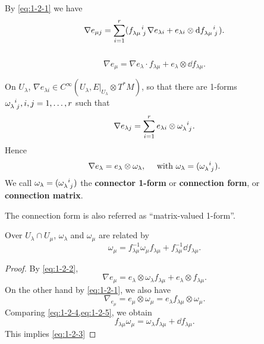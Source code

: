 \documentclass[12pt]{article}
\begin{document}
By \cref{eq:1-2-1} we have \[
    \nabla e_{\mu j}=\sum_{i=1}^{r}(\tensor{f}{_\lambda_\mu^i_j}\nabla 
    e_{\lambda i}+e_{\lambda i}\otimes \dd{\tensor{f}{_\lambda_\mu^i_j}})
.\] \ie\ 
\begin{equation}\label{eq:1-2-2}
    \nabla e_\mu=\nabla e_\lambda\cdot f_{\lambda\mu}+e_\lambda\otimes 
    \dd{f_{\lambda\mu}}
.\end{equation}

\begin{definition}
    On \(U_\lambda\), \(\nabla e_{\lambda i} \in C^\infty(U_\lambda,
    E\Big|_{U_\lambda}\otimes T^*M)\), so that there are 1-forms
    \(\tensor{\omega}{_\lambda^i_j}, i,j=1,\ldots,r\) such that \[
        \nabla e_{\lambda j}=\sum_{i=1}^{r}e_{\lambda i}\otimes 
        \tensor{\omega}{_\lambda^i_j}
    .\] Hence \[
        \nabla e_\lambda=e_\lambda\otimes \omega_\lambda, \quad
        \text{ with }\omega_\lambda=(\tensor{\omega}{_\lambda^i_j})
    .\] We call \(\omega_\lambda=(\tensor{\omega}{_\lambda^i_j})\) the
    \textbf{connector 1-form} or \textbf{connection form}, or
    \textbf{connection matrix}.
\end{definition}
The connection form is also referred as ``matrix-valued 1-form''.

\begin{prop}
    Over \(U_\lambda\cap U_\mu\), \(\omega_\lambda\) and \(\omega_\mu\)
    are related by
    \begin{equation}\label{eq:1-2-3}
        \omega_\mu=f_{\lambda\mu}^{-1}\omega_\mu f_{\lambda\mu}
        +f_{\lambda\mu}^{-1}\dd{f_{\lambda\mu}}
    .\end{equation}
\end{prop}
\begin{proof}
    By \cref{eq:1-2-2},
    \begin{equation}\label{eq:1-2-4}
        \nabla e_\mu=e_\lambda\otimes \omega_\lambda f_{\lambda\mu}
        +e_{\lambda}\otimes f_{\lambda\mu}
    .\end{equation}
    On the other hand by \cref{eq:1-2-1}, we also have
    \begin{equation}\label{eq:1-2-5}
        \nabla_{e_\mu}=e_{\mu}\otimes \omega_\mu
        =e_\lambda f_{\lambda\mu}\otimes \omega_\mu
    .\end{equation}
    Comparing \cref{eq:1-2-4,eq:1-2-5}, we obtain \[
        f_{\lambda\mu}\omega_\mu=\omega_\lambda f_{\lambda\mu}
        +\dd{f_{\lambda\mu}}
    .\] This implies \cref{eq:1-2-3}
\end{proof}
\end{document}
